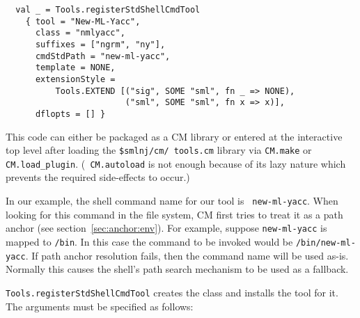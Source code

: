 \documentclass[titlepage,letterpaper]{article}
\begin{document}
\begin{verbatim}
  val _ = Tools.registerStdShellCmdTool
    { tool = "New-ML-Yacc",
      class = "nmlyacc",
      suffixes = ["ngrm", "ny"],
      cmdStdPath = "new-ml-yacc",
      template = NONE,
      extensionStyle =
          Tools.EXTEND [("sig", SOME "sml", fn _ => NONE),
                        ("sml", SOME "sml", fn x => x)],
      dflopts = [] }
\end{verbatim}

\begin{sloppy}
This code can either be packaged as a CM library or entered at the
interactive top level after loading the {\tt \$smlnj/cm/ tools.cm}
library via {\tt CM.make} or {\tt CM.load\_plugin}.  ({\tt
CM.autoload} is not enough because of its lazy nature which prevents
the required side-effects to occur.)
\end{sloppy}

In our example, the shell command name for our tool is {\tt
new-ml-yacc}.  When looking for this command in the file system, CM
first tries to treat it as a path anchor (see
section~\ref{sec:anchor:env}).  For example, suppose {\tt new-ml-yacc} is
mapped to {\tt /bin}.  In this case the command to be
invoked would be {\tt /bin/new-ml-yacc}.  If path anchor resolution
fails, then the command name will be used as-is.  Normally this
causes the shell's path search mechanism to be used as a fallback.

{\tt Tools.registerStdShellCmdTool} creates the class and installs the
tool for it.  The arguments must be specified as follows:
\end{document}
